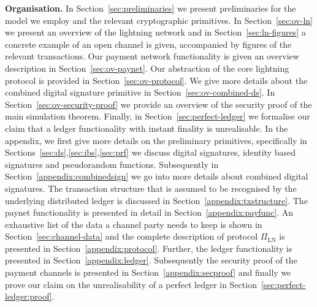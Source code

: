 \noindent \textbf{Organisation.} In Section~\ref{sec:preliminaries} we present
preliminaries for the model we employ and the relevant cryptographic primitives.
In Section~\ref{sec:ov-ln} we present an overview of the lightning network and
in Section~\ref{sec:ln-figures} a concrete example of an open channel is given,
accompanied by figures of the relevant transactions. Our payment network
functionality is given an overview description in Section~\ref{sec:ov-paynet}.
Our abstraction of the core lightning protocol is provided in
Section~\ref{sec:ov-protocol}. We give more details about the combined digital
signature primitive in Section~\ref{sec:ov-combined-ds}. In
Section~\ref{sec:ov-security-proof} we provide an overview of the security
proof of the main simulation theorem. Finally, in
Section~\ref{sec:perfect-ledger} we formalise our claim that a ledger
functionality with instant finality is unrealisable. In the appendix, we first
give more details on the preliminary primitives, specifically in
Sections~\ref{sec:ds},\ref{sec:ibs},\ref{sec:prf} we discuss digital signatures,
identity based signatures and pseudorandom functions. Subsequently in
Section~\ref{appendix:combinedsign} we go into more details about combined
digital signatures. The transaction structure that is assumed to be recognised
by the underlying distributed ledger is discussed in
Section~\ref{appendix:txstructure}. The paynet functionality is presented in
detail in Section~\ref{appendix:payfunc}. An exhaustive list of the data a
channel party needs to keep is shown in Section~\ref{sec:channel-data} and the
complete description of protocol $\Pi_{\mathrm{LN}}$ is presented in
Section~\ref{appendix:protocol}. Further, the ledger functionality is presented
in Section~\ref{appendix:ledger}. Subsequently the security proof of the payment
channels is presented in Section~\ref{appendix:secproof} and finally we prove
our claim on the unrealisability of a perfect ledger in
Section~\ref{sec:perfect-ledger:proof}.
